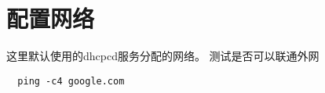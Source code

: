 \chapter{配置网络}
这里默认使用的dhcpcd服务分配的网络。
测试是否可以联通外网
\begin{lstlisting}
  ping -c4 google.com
\end{lstlisting}
